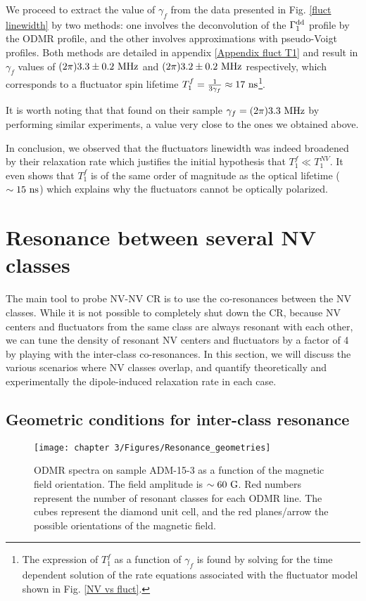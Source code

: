 \documentclass[a4paper, 11pt]{report}
\begin{document}
We proceed to extract the value of $\gamma_f$ from the data presented in Fig. \ref{fluct linewidth} by two methods: one involves the deconvolution of the $\Gamma_1^{\rm dd}$ profile by the ODMR profile, and the other involves approximations with pseudo-Voigt profiles. Both methods are detailed in appendix \ref{Appendix fluct T1} and result in $\gamma_f$ values of $(2\pi) 3.3 \pm 0.2\ \rm MHz$ and $(2\pi) 3.2 \pm 0.2\ \rm MHz$ respectively, which corresponds to a fluctuator spin lifetime $T_1^f=\frac{1}{3 \gamma_f}\approx 17\ \rm ns$\footnote{The expression of $T_1^f$ as a function of $\gamma_f$ is found by solving for the time dependent solution of the rate equations associated with the fluctuator model shown in Fig. \ref{NV vs fluct}.}.

It is worth noting that that \citep{choi2017depolarization} found on their sample $\gamma_f=(2\pi) 3.3\ \rm MHz$ by performing similar experiments, a value very close to the ones we obtained above.

In conclusion, we observed that the fluctuators linewidth was indeed broadened by their relaxation rate which justifies the initial hypothesis that $T_1^f \ll T_1^{NV}$. It even shows that $T_1^f$ is of the same order of magnitude as the optical lifetime ($\sim 15\ \rm ns$) which explains why the fluctuators cannot be optically polarized.

\section{Resonance between several NV classes}

The main tool to probe NV-NV CR is to use the co-resonances between the NV classes. While it is not possible to completely shut down the CR, because NV centers and fluctuators from the same class are always resonant with each other, we can tune the density of resonant NV centers and fluctuators by a factor of 4 by playing with the inter-class co-resonances. In this section, we will discuss the various scenarios where NV classes overlap, and quantify theoretically and experimentally the dipole-induced relaxation rate in each case.

\subsection{Geometric conditions for inter-class resonance}
\label{sec geometrie resonance}

\begin{figure}[h!]
\centering
\texttt{[image: chapter 3/Figures/Resonance\_geometries]}
\caption{ODMR spectra on sample ADM-15-3 as a function of the magnetic field orientation. The field amplitude is $\sim 60\ \rm G$. Red numbers represent the number of resonant classes for each ODMR line. The cubes represent the diamond unit cell, and the red planes/arrow the possible orientations of the magnetic field.}
\label{ODMR_geometries}
\end{figure}
\end{document}
